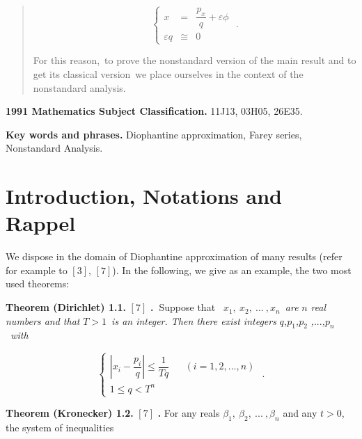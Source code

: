 \documentclass[12pt]{article}
\begin{document}
\begin{abstract}
\begin{equation*}
\left\{ 
\begin{array}{ccc}
x & = & \dfrac{p_{x}}{q}+\varepsilon \phi \\ 
\varepsilon q & \cong & 0%
\end{array}%
\text{ .}\right.
\end{equation*}

For this reason,\ to prove the nonstandard version of the main result and to
get its classical version\ we place ourselves in the context of the
nonstandard analysis.
\end{abstract}

\noindent \textbf{1991 Mathematics Subject Classification.} 11J13, 03H05,
26E35.

\noindent \textbf{Key words and phrases.} Diophantine approximation, Farey
series, Nonstandard Analysis.

\section{Introduction, Notations and Rappel}

We dispose in the domain of Diophantine approximation of many results (refer
for example to $\left[ 3\right] $, $\left[ 7\right] $). In the following, we
give as an example, the two most used theorems:

\noindent \textbf{Theorem (Dirichlet) 1.1. }$\left[ \text{7}\right] $\textbf{%
.\ }Suppose that \textit{\ }$x_{1}\mathit{,\ }x_{2}\mathit{,\ }...\mathit{\ ,%
}x_{n}$\textit{\ are }$n$ \textit{real numbers and that }$T>1$\textit{\ is
an integer. Then there exist integers }$q$\textit{,}$p_{1}$\textit{,}$p_{2}$%
\textit{,}$...$\textit{,}$p_{n}$\textit{\ with }

\begin{equation}
\left\{ 
\begin{array}{ccc}
\left\vert x_{i}-\dfrac{p_{i}}{q}\right\vert \leq \dfrac{1}{Tq} &  & \left(
i=1,2,...,n\right) \\ 
1\leq q<T^{n} &  & 
\end{array}%
\text{ .}\right.  \tag{1.1}
\end{equation}

\noindent \textbf{Theorem (Kronecker) 1.2. }$\left[ \text{7}\right] $\textbf{%
.} For any reals $\beta _{1}\mathit{,\ }\beta _{2}\mathit{,\ }...\mathit{\ ,}%
\beta _{n}$ and any $t>0$, the system of inequalities
\end{document}
